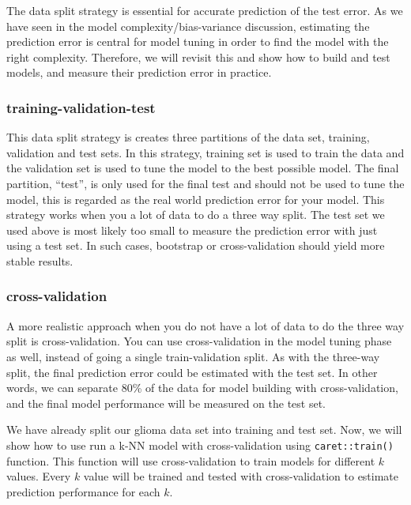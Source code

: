 \documentclass[12pt,]{krantz}
\begin{document}
The data split strategy is essential for accurate prediction of the test error. As we have seen in the model complexity/bias-variance discussion, estimating the prediction error is central for model tuning in order to find the model with the right complexity. Therefore, we will revisit this and show how to build and test models, and measure their prediction error in practice.

\hypertarget{training-validation-test}{%
\subsubsection{training-validation-test}\label{training-validation-test}}

This data split strategy is creates three partitions of the data set, training, validation and test sets. In this strategy, training set is used to train the data and the validation set is used to tune the model to the best possible model. The final partition, ``test'', is only used for the final test and should not be used to tune the model, this is regarded as the real world prediction error for your model. This strategy works when you a lot of data to do a three way split. The test set we used above is most likely too small to measure the prediction error with just using a test set. In such cases, bootstrap or cross-validation should yield more stable results.

\hypertarget{cross-validation-1}{%
\subsubsection{cross-validation}\label{cross-validation-1}}

A more realistic approach when you do not have a lot of data to do the three way split is cross-validation. You can use cross-validation in the model tuning phase as well, instead of going a single train-validation split. As with the three-way split, the final prediction error could be estimated with the test set. In other words, we can separate 80\% of the data for model building with cross-validation, and the final model performance will be measured on the test set.

We have already split our glioma data set into training and test set. Now, we will show how to use run a k-NN model with cross-validation using \texttt{caret::train()} function. This function will use cross-validation to train models for different \(k\) values. Every \(k\) value will be trained and tested with cross-validation to estimate prediction performance for each \(k\).
\end{document}
